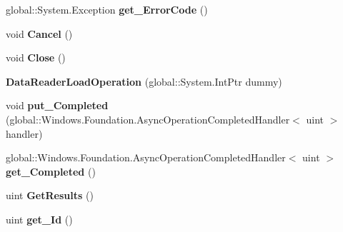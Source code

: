 \begin{DoxyCompactItemize}
global\+::\+System.\+Exception {\bfseries get\+\_\+\+Error\+Code} ()
\item 
\mbox{\label{class_windows_1_1_storage_1_1_streams_1_1_data_reader_load_operation_afc9128d61314f4f914e6ced27b10551a}} 
void {\bfseries Cancel} ()
\item 
\mbox{\label{class_windows_1_1_storage_1_1_streams_1_1_data_reader_load_operation_a4b0027a73595ac1ed2b96b4c17c64541}} 
void {\bfseries Close} ()
\item 
\mbox{\label{class_windows_1_1_storage_1_1_streams_1_1_data_reader_load_operation_a1bc1b17adae2e272b26f6a612e36b5a9}} 
{\bfseries Data\+Reader\+Load\+Operation} (global\+::\+System.\+Int\+Ptr dummy)
\item 
\mbox{\label{class_windows_1_1_storage_1_1_streams_1_1_data_reader_load_operation_a825056cde4984124d6ba72b348a21927}} 
void {\bfseries put\+\_\+\+Completed} (global\+::\+Windows.\+Foundation.\+Async\+Operation\+Completed\+Handler$<$ uint $>$ handler)
\item 
\mbox{\label{class_windows_1_1_storage_1_1_streams_1_1_data_reader_load_operation_ac568f7677660d25791d132dadf2fa2b8}} 
global\+::\+Windows.\+Foundation.\+Async\+Operation\+Completed\+Handler$<$ uint $>$ {\bfseries get\+\_\+\+Completed} ()
\item 
\mbox{\label{class_windows_1_1_storage_1_1_streams_1_1_data_reader_load_operation_a71f1295140022865ce49695a3490008d}} 
uint {\bfseries Get\+Results} ()
\item 
\mbox{\label{class_windows_1_1_storage_1_1_streams_1_1_data_reader_load_operation_a6ef99092e68b2e93880c4edcaf0fd191}} 
uint {\bfseries get\+\_\+\+Id} ()
\item 
\mbox{\label{class_windows_1_1_storage_1_1_streams_1_1_data_reader_load_operation_a7eee8fde2644e8d129c57b70e838cd7d}} 

\end{DoxyCompactItemize}
